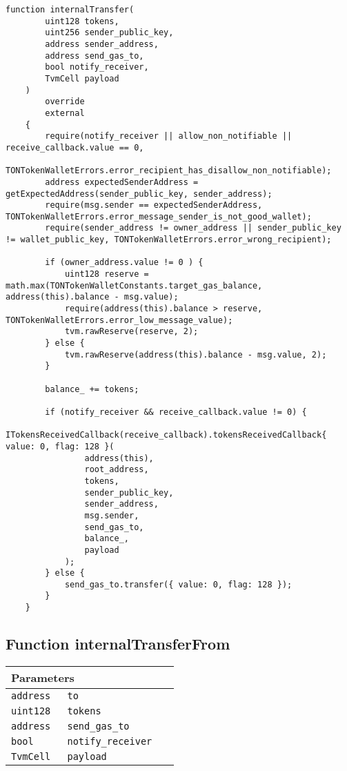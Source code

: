 \vspace{2cm}

\begin{lstlisting}[firstnumber=370]
    function internalTransfer(
        uint128 tokens,
        uint256 sender_public_key,
        address sender_address,
        address send_gas_to,
        bool notify_receiver,
        TvmCell payload
    )
        override
        external
    {
        require(notify_receiver || allow_non_notifiable || receive_callback.value == 0,
                TONTokenWalletErrors.error_recipient_has_disallow_non_notifiable);
        address expectedSenderAddress = getExpectedAddress(sender_public_key, sender_address);
        require(msg.sender == expectedSenderAddress, TONTokenWalletErrors.error_message_sender_is_not_good_wallet);
        require(sender_address != owner_address || sender_public_key != wallet_public_key, TONTokenWalletErrors.error_wrong_recipient);

        if (owner_address.value != 0 ) {
            uint128 reserve = math.max(TONTokenWalletConstants.target_gas_balance, address(this).balance - msg.value);
            require(address(this).balance > reserve, TONTokenWalletErrors.error_low_message_value);
            tvm.rawReserve(reserve, 2);
        } else {
            tvm.rawReserve(address(this).balance - msg.value, 2);
        }

        balance_ += tokens;

        if (notify_receiver && receive_callback.value != 0) {
            ITokensReceivedCallback(receive_callback).tokensReceivedCallback{ value: 0, flag: 128 }(
                address(this),
                root_address,
                tokens,
                sender_public_key,
                sender_address,
                msg.sender,
                send_gas_to,
                balance_,
                payload
            );
        } else {
            send_gas_to.transfer({ value: 0, flag: 128 });
        }
    }
\end{lstlisting}

\subsection{Function internalTransferFrom}


\ifsoltables
\noindent\begin{tabular}{|l|l|p{5cm}|}\hline
\multicolumn{3}{|l|}{\bf Parameters}\\\hline
\tt address & \tt to &\\\hline
\tt uint128 & \tt tokens &\\\hline
\tt address & \tt send\_{}gas\_{}to &\\\hline
\tt bool & \tt notify\_{}receiver &\\\hline
\tt TvmCell & \tt payload &\\\hline
\end{tabular}
\fi

